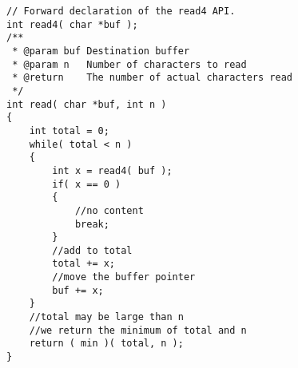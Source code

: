 
\setcounter{lstlisting}{0}
\begin{lstlisting}[style=customc, caption={Pointer}]
// Forward declaration of the read4 API.
int read4( char *buf );
/**
 * @param buf Destination buffer
 * @param n   Number of characters to read
 * @return    The number of actual characters read
 */
int read( char *buf, int n )
{
    int total = 0;
    while( total < n )
    {
        int x = read4( buf );
        if( x == 0 )
        {
            //no content
            break;
        }
        //add to total
        total += x;
        //move the buffer pointer
        buf += x;
    }
    //total may be large than n
    //we return the minimum of total and n
    return ( min )( total, n );
}
\end{lstlisting}